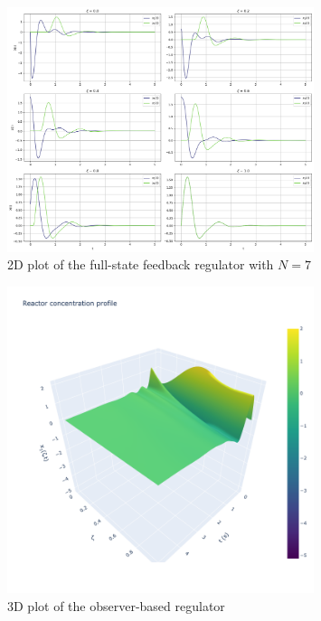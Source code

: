 \begin{figure}[!htbp]
    \centering
    \includegraphics[width=0.8\textwidth]{Figures/2D_xt_k7.png}
    \caption{2D plot of the full-state feedback regulator with $N=7$}
    \label{fig:2D_xt_k7}
\end{figure}

\begin{figure}[!htbp]
    \centering
    \includegraphics[width=0.8\textwidth]{Figures/3D_x1_L_k7.png}
    \caption{3D plot of the observer-based regulator}
    \label{fig:3D_x1_L_k7}
\end{figure}

